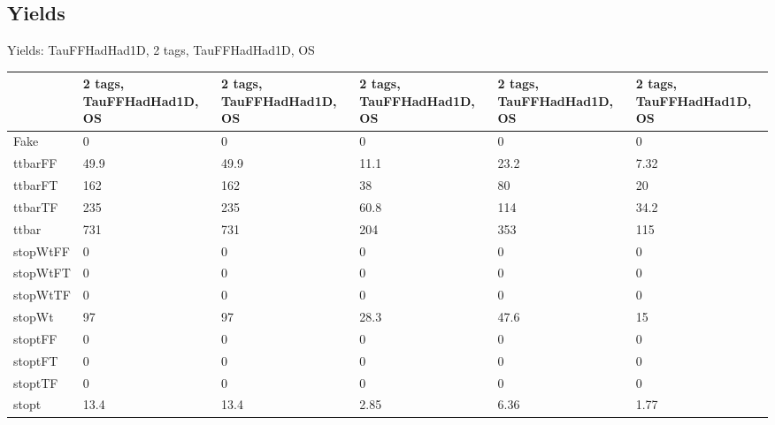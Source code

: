 
\subsection{Yields}

\begin{frame}{Yields: TauFFHadHad1D, 2 tags, TauFFHadHad1D, OS}
\begin{center}
  \begin{tabular}{l| >{\centering\let\newline\\\arraybackslash\hspace{0pt}}m{1.4cm}| >{\centering\let\newline\\\arraybackslash\hspace{0pt}}m{1.4cm}| >{\centering\let\newline\\\arraybackslash\hspace{0pt}}m{1.4cm}| >{\centering\let\newline\\\arraybackslash\hspace{0pt}}m{1.4cm}| >{\centering\let\newline\\\arraybackslash\hspace{0pt}}m{1.4cm}}
    & 2 tags, TauFFHadHad1D, OS & 2 tags, TauFFHadHad1D, OS & 2 tags, TauFFHadHad1D, OS & 2 tags, TauFFHadHad1D, OS & 2 tags, TauFFHadHad1D, OS \\
 \hline \hline
    Fake& 0 & 0 & 0 & 0 & 0 \\
 \hline
    ttbarFF& 49.9 & 49.9 & 11.1 & 23.2 & 7.32 \\
 \hline
    ttbarFT& 162 & 162 & 38 & 80 & 20 \\
 \hline
    ttbarTF& 235 & 235 & 60.8 & 114 & 34.2 \\
 \hline
    ttbar& 731 & 731 & 204 & 353 & 115 \\
 \hline
    stopWtFF& 0 & 0 & 0 & 0 & 0 \\
 \hline
    stopWtFT& 0 & 0 & 0 & 0 & 0 \\
 \hline
    stopWtTF& 0 & 0 & 0 & 0 & 0 \\
 \hline
    stopWt& 97 & 97 & 28.3 & 47.6 & 15 \\
 \hline
    stoptFF& 0 & 0 & 0 & 0 & 0 \\
 \hline
    stoptFT& 0 & 0 & 0 & 0 & 0 \\
 \hline
    stoptTF& 0 & 0 & 0 & 0 & 0 \\
 \hline
    stopt& 13.4 & 13.4 & 2.85 & 6.36 & 1.77 \\

\end{tabular}
\end{center}
\end{frame}
